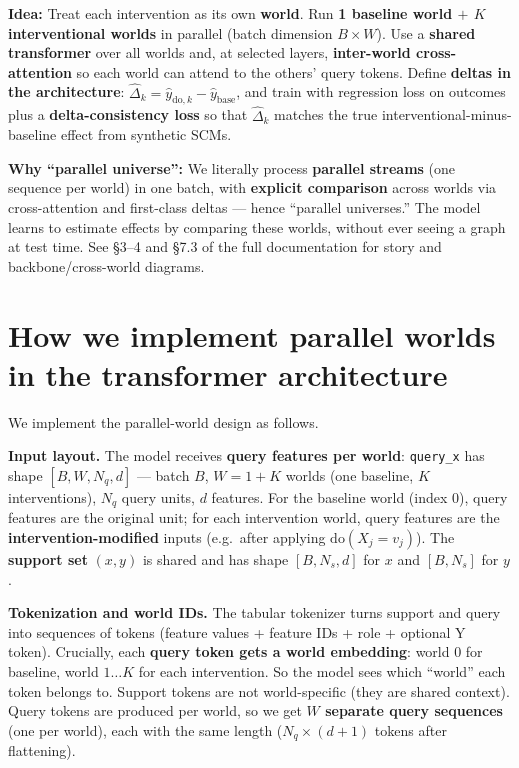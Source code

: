 \documentclass[12pt]{article}
\begin{document}
\textbf{Idea:} Treat each intervention as its own \textbf{world}. Run \textbf{1 baseline world $+$ $K$ interventional worlds} in parallel (batch dimension $B \times W$). Use a \textbf{shared transformer} over all worlds and, at selected layers, \textbf{inter-world cross-attention} so each world can attend to the others' query tokens. Define \textbf{deltas in the architecture}: $\hat{\Delta}_k = \hat{y}_{\text{do},k} - \hat{y}_{\text{base}}$, and train with regression loss on outcomes plus a \textbf{delta-consistency loss} so that $\hat{\Delta}_k$ matches the true interventional-minus-baseline effect from synthetic SCMs.

\textbf{Why ``parallel universe'':} We literally process \textbf{parallel streams} (one sequence per world) in one batch, with \textbf{explicit comparison} across worlds via cross-attention and first-class deltas --- hence ``parallel universes.'' The model learns to estimate effects by comparing these worlds, without ever seeing a graph at test time. See \S3--4 and \S7.3 of the full documentation for story and backbone/cross-world diagrams.

\section{How we implement parallel worlds in the transformer architecture}

We implement the parallel-world design as follows.

\textbf{Input layout.} The model receives \textbf{query features per world}: \texttt{query\_x} has shape $[B, W, N_q, d]$ --- batch $B$, $W = 1+K$ worlds (one baseline, $K$ interventions), $N_q$ query units, $d$ features. For the baseline world (index 0), query features are the original unit; for each intervention world, query features are the \textbf{intervention-modified} inputs (e.g.\ after applying $\text{do}(X_j = v_j)$). The \textbf{support set} $(x, y)$ is shared and has shape $[B, N_s, d]$ for $x$ and $[B, N_s]$ for $y$.

\textbf{Tokenization and world IDs.} The tabular tokenizer turns support and query into sequences of tokens (feature values + feature IDs + role + optional Y token). Crucially, each \textbf{query token gets a world embedding}: world 0 for baseline, world $1 \ldots K$ for each intervention. So the model sees which ``world'' each token belongs to. Support tokens are not world-specific (they are shared context). Query tokens are produced per world, so we get \textbf{$W$ separate query sequences} (one per world), each with the same length ($N_q \times (d+1)$ tokens after flattening).
\end{document}
